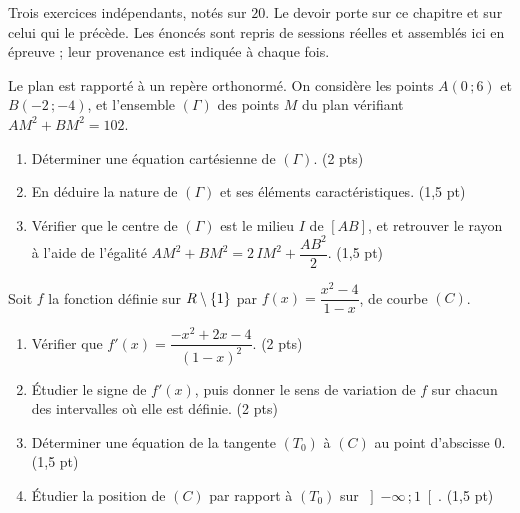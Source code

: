 \begin{devoir}[2 heures]
Trois exercices indépendants, notés sur $20$. Le devoir porte sur ce chapitre
et sur celui qui le précède. Les énoncés sont repris de sessions réelles et
assemblés ici en épreuve ; leur provenance est indiquée à chaque fois.

Le plan est rapporté à un repère orthonormé. On considère les points
$A(0\,;6)$ et $B(-2\,;-4)$, et l'ensemble $(\Gamma)$ des points $M$ du plan
vérifiant $AM^{2}+BM^{2} = 102$.
\begin{enumerate}[label=\textbf{\arabic*.}, leftmargin=*, itemsep=0.2em]
  \item Déterminer une équation cartésienne de $(\Gamma)$.
        \hfill\textup{(2 pts)}
  \item En déduire la nature de $(\Gamma)$ et ses éléments caractéristiques.
        \hfill\textup{(1,5 pt)}
  \item Vérifier que le centre de $(\Gamma)$ est le milieu $I$ de $[AB]$, et
        retrouver le rayon à l'aide de l'égalité
        $AM^{2}+BM^{2} = 2\,IM^{2}+\dfrac{AB^{2}}{2}$.
        \hfill\textup{(1,5 pt)}
\end{enumerate}

Soit $f$ la fonction définie sur $R\setminus\{1\}$ par
$f(x) = \dfrac{x^{2}-4}{1-x}$, de courbe $(C)$.
\begin{enumerate}[label=\textbf{\arabic*.}, leftmargin=*, itemsep=0.2em]
  \item Vérifier que $f'(x) = \dfrac{-x^{2}+2x-4}{(1-x)^{2}}$.
        \hfill\textup{(2 pts)}
  \item Étudier le signe de $f'(x)$, puis donner le sens de variation de $f$
        sur chacun des intervalles où elle est définie.
        \hfill\textup{(2 pts)}
  \item Déterminer une équation de la tangente $(T_{0})$ à $(C)$ au point
        d'abscisse $0$. \hfill\textup{(1,5 pt)}
  \item Étudier la position de $(C)$ par rapport à $(T_{0})$ sur
        $\left]-\infty\,;1\right[$. \hfill\textup{(1,5 pt)}
\end{enumerate}


\end{devoir}
